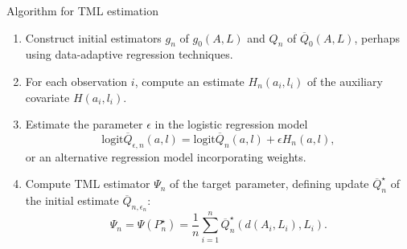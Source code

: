 \documentclass{beamer}
\begin{document}


\begin{frame}[c]{Algorithm for TML estimation}

\begin{center}
\begin{enumerate}\label{tmle_algo}
  \itemsep6pt
  \item Construct initial estimators $g_n$ of $g_0(A, L)$ and $Q_n$ of
    $\overline{Q}_0(A, L)$, perhaps using data-adaptive regression techniques.
  \item For each observation $i$, compute an estimate $H_n(a_i, l_i)$ of the
    auxiliary covariate $H(a_i,l_i)$.
  \item Estimate the parameter $\epsilon$ in the logistic regression model
    $$\text{logit}\overline{Q}_{\epsilon, n}(a, l) =
    \text{logit}\overline{Q}_n(a, l) + \epsilon H_n(a, l),$$
    or an alternative regression model incorporating weights.
  \item Compute TML estimator $\Psi_n$ of the target parameter, defining update
    $\overline{Q}_n^{\star}$ of the initial estimate
    $\overline{Q}_{n, \epsilon_n}$:
    \begin{equation*}\label{tmle}
      \Psi_n = \Psi(P_n^{\star}) = \frac{1}{n} \sum_{i = 1}^n
        \overline{Q}_n^{\star}(d(A_i, L_i), L_i).
      \end{equation*}
\end{enumerate}
\end{center}


\end{frame}

\end{document}
